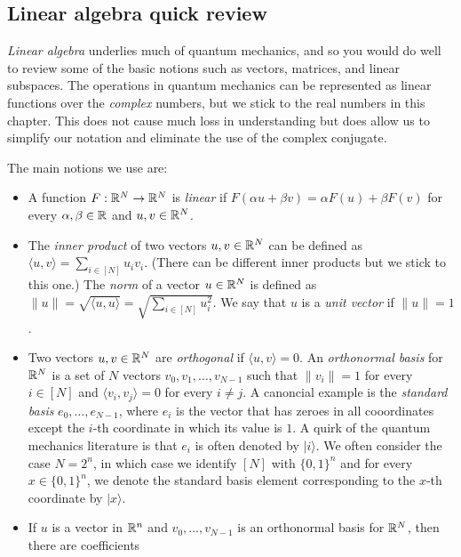 \subsection{Linear algebra quick
review}\label{Linear-algebra-quick-revi}

\emph{Linear algebra} underlies much of quantum mechanics, and so you
would do well to review some of the basic notions such as vectors,
matrices, and linear subspaces. The operations in quantum mechanics can
be represented as linear functions over the \emph{complex} numbers, but
we stick to the real numbers in this chapter. This does not cause much
loss in understanding but does allow us to simplify our notation and
eliminate the use of the complex conjugate.

The main notions we use are:

\begin{itemize}
\item
  A function \(F:{\mathbb{R}}^N \rightarrow {\mathbb{R}}^N\) is \emph{linear} if
  \(F(\alpha u + \beta v) = \alpha F(u) + \beta F(v)\) for every
  \(\alpha,\beta \in {\mathbb{R}}\) and \(u,v \in {\mathbb{R}}^N\).
\item
  The \emph{inner product} of two vectors \(u,v \in {\mathbb{R}}^N\) can be
  defined as \(\langle u,v \rangle = \sum_{i\in [N]} u_iv_i\). (There
  can be different inner products but we stick to this one.) The
  \emph{norm} of a vector \(u \in {\mathbb{R}}^N\) is defined as
  \(\|u\| = \sqrt{\langle u,u \rangle} = \sqrt{\sum_{i\in [N]}u_i^2}\).
  We say that \(u\) is a \emph{unit vector} if \(\|u\|=1\).
\item
  Two vectors \(u,v \in {\mathbb{R}}^N\) are \emph{orthogonal} if
  \(\langle u,v\rangle = 0\). An \emph{orthonormal basis} for \({\mathbb{R}}^N\)
  is a set of \(N\) vectors \(v_0,v_1,\ldots, v_{N-1}\) such that
  \(\| v_i \|=1\) for every \(i\in [N]\) and
  \(\langle v_i,v_j \rangle=0\) for every \(i\neq j\). A canoncial
  example is the \emph{standard basis} \(e_0,\ldots,e_{N-1}\), where
  \(e_i\) is the vector that has zeroes in all cooordinates except the
  \(i\)-th coordinate in which its value is \(1\). A quirk of the
  quantum mechanics literature is that \(e_i\) is often denoted by
  \(|i \rangle\). We often consider the case \(N=2^n\), in which case we
  identify \([N]\) with \(\{0,1\}^n\) and for every \(x\in \{0,1\}^n\),
  we denote the standard basis element corresponding to the \(x\)-th
  coordinate by \(|x \rangle\).
\item
  If \(u\) is a vector in \({\mathbb{R}}^n\) and \(v_0,\ldots,v_{N-1}\) is an
  orthonormal basis for \({\mathbb{R}}^N\), then there are coefficients

\end{itemize}
